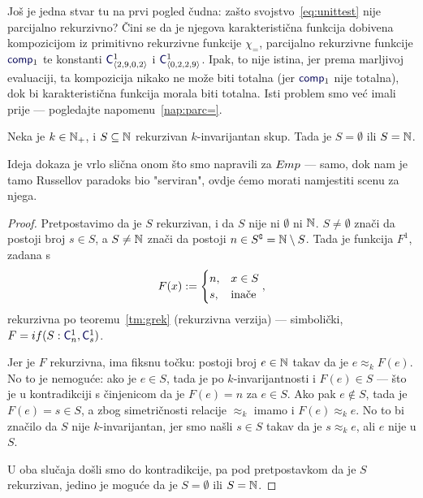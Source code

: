 Još je jedna stvar tu na prvi pogled čudna: zašto svojstvo~\eqref{eq:unittest} nije parcijalno rekurzivno? Čini se da je njegova karakteristična funkcija dobivena kompozicijom iz primitivno rekurzivne funkcije $\chi_=$, parcijalno rekurzivne funkcije $\f{comp}_1$ te konstanti $\f C^1_{\kr{2,9,0,2}}$ i $\f C^1_{\kr{0,2,2,9}}$. Ipak, to nije istina, jer prema marljivoj evaluaciji, ta kompozicija nikako ne može biti totalna (jer $\f{comp}_1$ nije totalna), dok bi karakteristična funkcija morala biti totalna. Isti problem smo već imali prije --- pogledajte napomenu~\ref{nap:parc=}.


\begin{teorem}\label{tm:Rice}
Neka je $k\in{\mathbb N}_+$, i $S\subseteq{\mathbb N}$ rekurzivan $k$-invarijantan skup. Tada je $S=\emptyset$ ili $S={\mathbb N}$.
\end{teorem}

Ideja dokaza je vrlo slična onom što smo napravili za $E\mspace{-1mu}mp$ --- samo, dok nam je tamo Russellov paradoks bio "serviran"\!, ovdje ćemo morati namjestiti scenu za njega.

\begin{proof}
Pretpostavimo da je $S$ rekurzivan, i da $S$ nije ni $\emptyset$ ni ${\mathbb N}$. $S\ne\emptyset$ znači da postoji broj $s\in S$, a $S\ne{\mathbb N}$ znači da postoji $n\in S\sp{{\scriptscriptstyle\complement}}={\mathbb N}\setminus S$. Tada je funkcija $F^1$, zadana s
\begin{equation}
    F(x):=\begin{cases}
        n,&x\in S\\
        s,&\text{inače}
    \end{cases}\text,
\end{equation}
    rekurzivna po teoremu~\ref{tm:grek} (rekurzivna verzija) --- simbolički, $F=\IF{S:\f C_n^1,\f C_s^1}$.

Jer je $F$ rekurzivna, ima fiksnu točku: postoji broj $e\in{\mathbb N}$ takav da je $e\approx_k F(e)$. No to je nemoguće: ako je $e\in S$, tada je po $k$-invarijantnosti i $F(e)\in S$ --- što je u kontradikciji s činjenicom da je $F(e)=n$ za $e\in S$. Ako pak $e\notin S$, tada je $F(e)=s\in S$, a zbog simetričnosti relacije $\approx_k$ imamo i $F(e)\approx_k e$. No to bi značilo da $S$ nije $k$-invarijantan, jer smo našli $s\in S$ takav da je $s\approx_k e$, ali $e$ nije u $S$.

U oba slučaja došli smo do kontradikcije, pa pod pretpostavkom da je $S$ rekurzivan, jedino je moguće da je $S=\emptyset$ ili $S={\mathbb N}$.
\end{proof}

